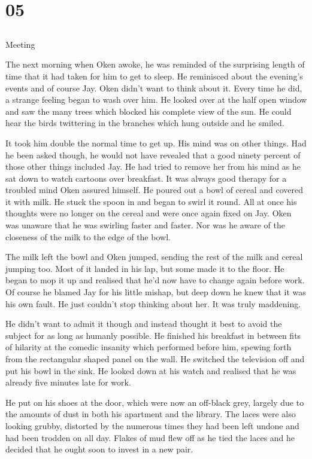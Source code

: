 \chapter{05}
\section{}
Meeting  

The next morning when Oken awoke, he was reminded of the surprising length of time that it had taken for him to get to sleep.  He reminisced about the evening's events and of course Jay.  Oken didn't want to think about it.  Every time he did, a strange feeling began to wash over him.  He looked over at the half open window and saw the many trees which blocked his complete view of the sun.  He could hear the birds twittering in the branches which hung outside and he smiled.

It took him double the normal time to get up.  His mind was on other things.  Had he been asked though, he would not have revealed that a good ninety percent of those other things included Jay.  He had tried to remove her from his mind as he sat down to watch cartoons over breakfast.  It was always good therapy for a troubled mind Oken assured himself.  He poured out a bowl of cereal and covered it with milk.  He stuck the spoon in and began to swirl it round.  All at once his thoughts were no longer on the cereal and were once again fixed on Jay.  Oken was unaware that he was swirling faster and faster.  Nor was he aware of the closeness of the milk to the edge of the bowl.

The milk left the bowl and Oken jumped, sending the rest of the milk and cereal jumping too.  Most of it landed in his lap, but some made it to the floor.  He began to mop it up and realised that he'd now have to change again before work. Of course he blamed Jay for his little mishap, but deep down he knew that it was his own fault.  He just couldn't stop thinking about her.  It was truly maddening.

He didn't want to admit it though and instead thought it best to avoid the subject for as long as humanly possible.  He finished his breakfast in between fits of hilarity at the comedic insanity which performed before him, spewing forth from the rectangular shaped panel on the wall.  He switched the television off and put his bowl in the sink.  He looked down at his watch and realised that he was already five minutes late for work.  

He put on his shoes at the door, which were now an off-black grey, largely due to the amounts of dust in both his apartment and the library.  The laces were also looking grubby, distorted by the numerous times they had been left undone and had been trodden on all day.  Flakes of mud flew off as he tied the laces and he decided that he ought soon to invest in a new pair.  

